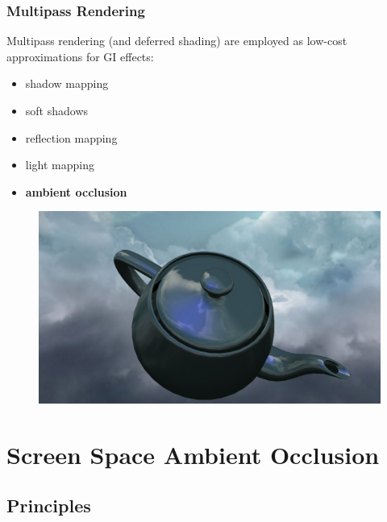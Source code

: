 \documentclass{beamer}
\begin{document}
\begin{frame}[allowframebreaks]
\frametitle{Multipass Rendering}
Multipass rendering (and deferred shading) are employed as low-cost approximations for GI effects:
\begin{itemize}
    \item shadow mapping
    \item soft shadows
    \item reflection mapping
    \item light mapping
    \item \textbf{ambient occlusion}
\end{itemize}

\begin{figure}
    \centering
    \includegraphics[width=0.9\linewidth]{images/reflection_map.jpg}
\end{figure}

\end{frame}


\section{Screen Space Ambient Occlusion}

\subsection{Principles}
\end{document}
